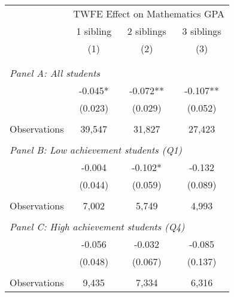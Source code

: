\makeatletter
{}
{
\makeatother
\begin{tabular}{lccc}
\toprule
\cmidrule(lr){2-4}
& \multicolumn{3}{c}{TWFE Effect on Mathematics GPA} \\
\cmidrule(lr){2-4}
& 1 sibling & 2 siblings & 3 siblings  \\
\cmidrule(lr){2-2} \cmidrule(lr){3-3} \cmidrule(lr){4-4}
& (1) & (2) & (3)\\
\bottomrule
&  &  &  \\
&  &  &   \\
\multicolumn{4}{l}{\textit{Panel A: All students}} \\
\hspace{3mm}        &      -0.045*  &      -0.072** &      -0.107** \\
                    &     (0.023)   &     (0.029)   &     (0.052)   \\
                    &               &               &               \\
\hspace{3mm}Observations&      39,547   &      31,827   &      27,423   \\
 
&  &  &   \\
\multicolumn{4}{l}{\textit{Panel B: Low achievement students (Q1)}} \\
\hspace{3mm}        &      -0.004   &      -0.102*  &      -0.132   \\
                    &     (0.044)   &     (0.059)   &     (0.089)   \\
                    &               &               &               \\
\hspace{3mm}Observations&       7,002   &       5,749   &       4,993   \\
 
&  &  &   \\
\multicolumn{4}{l}{\textit{Panel C: High achievement students (Q4)}} \\
\hspace{3mm}        &      -0.056   &      -0.032   &      -0.085   \\
                    &     (0.048)   &     (0.067)   &     (0.137)   \\
                    &               &               &               \\
\hspace{3mm}Observations&       9,435   &       7,334   &       6,316   \\
 

\end{tabular}}
